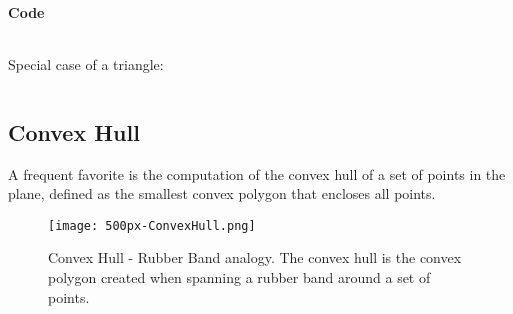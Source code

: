 \paragraph{Code}
\inputminted[fontsize=\footnotesize,linenos=true]{java}{code/polygonarea.java}

Special case of a triangle:

\inputminted[fontsize=\footnotesize,linenos=true]{java}{code/triangleareacoord.java}

%
%
\subsection{Convex Hull}
\label{sec:convexhull}

A frequent favorite is the computation of the convex hull of a set of points in the plane,
defined as the smallest convex polygon that encloses all points.

\begin{figure}
    \centering
    \texttt{[image: 500px-ConvexHull.png]}
    \caption{Convex Hull - Rubber Band analogy. The convex hull is the convex polygon created 
        when spanning a rubber band around a set of points.}
    \label{fig:convexhull}
\end{figure}

